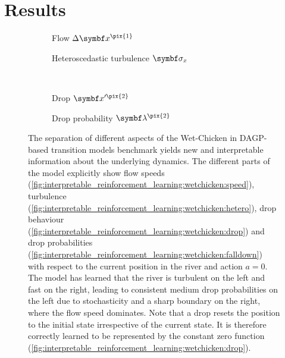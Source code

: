 \section{Results}
\label{toc:interpretable_rl:results}
\begin{figure}[tp]
    \centering
    \begin{subfigure}[b]{\halffigurewidth}
        \centering
        
        \caption{
        \label{fig:interpretable_rl:wetchicken:speed}
        Flow $\Delta\mat{x}^{\pix{1}}$
        }
    \end{subfigure}
    \hfill
    \begin{subfigure}[b]{\halffigurewidth}
        \centering
        
        \caption{
            \label{fig:interpretable_rl:wetchicken:hetero}
            Heteroscedastic turbulence $\mat{\sigma}_x$
        }
    \end{subfigure}\\[\figureskip]
    \begin{subfigure}[b]{\halffigurewidth}
        \centering
        
        \caption{
        \label{fig:interpretable_rl:wetchicken:drop}
        Drop $\mat{x}^{\prime\pix{2}}$
        }
    \end{subfigure}
    \hfill
    \begin{subfigure}[b]{\halffigurewidth}
        \centering
        
        \caption{
        \label{fig:interpretable_rl:wetchicken:falldown}
        Drop probability $\mat{\lambda}^{\pix{2}}$
        }
    \end{subfigure}
    \caption{
        \label{fig:interpretable_rl:wetchicken:dynamics}
        The separation of different aspects of the Wet-Chicken in DAGP-based transition models benchmark yields new and interpretable information about the underlying dynamics.
        The different parts of the model explicitly show flow speeds (\cref{fig:interpretable_reinforcement_learning:wetchicken:speed}), turbulence (\cref{fig:interpretable_reinforcement_learning:wetchicken:hetero}), drop behaviour (\cref{fig:interpretable_reinforcement_learning:wetchicken:drop}) and drop probabilities (\cref{fig:interpretable_reinforcement_learning:wetchicken:falldown}) with respect to the current position in the river and action $a = 0$.
        The model has learned that the river is turbulent on the left and fast on the right, leading to consistent medium drop probabilities on the left due to stochasticity and a sharp boundary on the right, where the flow speed dominates.
        Note that a drop resets the position to the initial state irrespective of the current state.
        It is therefore correctly learned to be represented by the constant zero function (\cref{fig:interpretable_reinforcement_learning:wetchicken:drop}).
    }
\end{figure}
